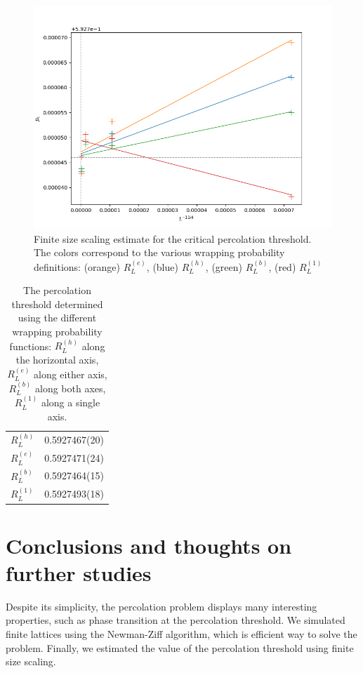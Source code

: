 \begin{figure}
	\centering
		\includegraphics[width=0.9\linewidth]{../plots/plot2}
		\caption{\label{fig:plot2} Finite size scaling estimate for the critical percolation threshold. The colors correspond to the various wrapping probability definitions: (orange) $R_L^{(e)}$, (blue) $R_L^{(h)}$, (green) $R_L^{(b)}$, (red) $R_L^{(1)}$}
\end{figure}

\begin{table}[!htpb]
	\centering
		\begin{tabular}{ll}
		$R_L^{(h)}$ & 0.5927467(20) \\
		$R_L^{(e)}$ & 0.5927471(24) \\
		$R_L^{(b)}$ & 0.5927464(15) \\
		$R_L^{(1)}$ & 0.5927493(18)
		\end{tabular}
	\caption{\label{table:pc} The percolation threshold determined using the different wrapping probability functions: $R_L^{(h)}$ along the horizontal axis, $R_L^{(e)}$ along either axis, $R_L^{(b)}$ along both axes, $R_L^{(1)}$ along a single axis. }
\end{table}


\section{Conclusions and thoughts on further studies}
Despite its simplicity, the percolation problem displays many interesting properties, such as phase transition at the percolation threshold. We simulated finite lattices using the Newman-Ziff algorithm, which is efficient way to solve the problem. Finally, we estimated the value of the percolation threshold using finite size scaling. 

